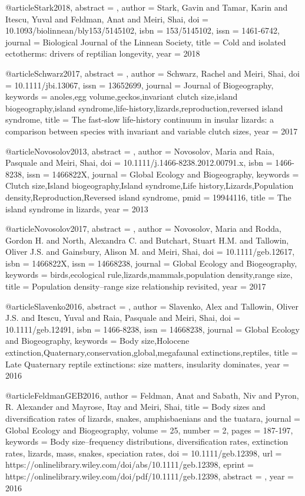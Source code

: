 {{{{{{@article{Stark2018,
abstract = {},
author = {Stark, Gavin and Tamar, Karin and Itescu, Yuval and Feldman, Anat and Meiri, Shai},
doi = {10.1093/biolinnean/bly153/5145102},
isbn = {153/5145102},
issn = {1461-6742},
journal = {Biological Journal of the Linnean Society},
title = {{Cold and isolated ectotherms: drivers of reptilian longevity}},
year = {2018}
}

@article{Schwarz2017,
abstract = {},
author = {Schwarz, Rachel and Meiri, Shai},
doi = {10.1111/jbi.13067},
issn = {13652699},
journal = {Journal of Biogeography},
keywords = {anoles,egg volume,geckos,invariant clutch size,island biogeography,island syndrome,life-history,lizards,reproduction,reversed island syndrome},
title = {{The fast-slow life-history continuum in insular lizards: a comparison between species with invariant and variable clutch sizes}},
year = {2017}
}

@article{Novosolov2013,
abstract = {},
author = {Novosolov, Maria and Raia, Pasquale and Meiri, Shai},
doi = {10.1111/j.1466-8238.2012.00791.x},
isbn = {1466-8238},
issn = {1466822X},
journal = {Global Ecology and Biogeography},
keywords = {Clutch size,Island biogeography,Island syndrome,Life history,Lizards,Population density,Reproduction,Reversed island syndrome},
pmid = {19944116},
title = {{The island syndrome in lizards}},
year = {2013}
}

@article{Novosolov2017,
abstract = {},
author = {Novosolov, Maria and Rodda, Gordon H. and North, Alexandra C. and Butchart, Stuart H.M. and Tallowin, Oliver J.S. and Gainsbury, Alison M. and Meiri, Shai},
doi = {10.1111/geb.12617},
isbn = {1466822X},
issn = {14668238},
journal = {Global Ecology and Biogeography},
keywords = {birds,ecological rule,lizards,mammals,population density,range size},
title = {{Population density–range size relationship revisited}},
year = {2017}
}

@article{Slavenko2016,
abstract = {},
author = {Slavenko, Alex and Tallowin, Oliver J.S. and Itescu, Yuval and Raia, Pasquale and Meiri, Shai},
doi = {10.1111/geb.12491},
isbn = {1466-8238},
issn = {14668238},
journal = {Global Ecology and Biogeography},
keywords = {Body size,Holocene extinction,Quaternary,conservation,global,megafaunal extinctions,reptiles},
title = {{Late Quaternary reptile extinctions: size matters, insularity dominates}},
year = {2016}
}

@article{FeldmanGEB2016,
author = {Feldman, Anat and Sabath, Niv and Pyron, R. Alexander and Mayrose, Itay and Meiri, Shai},
title = {Body sizes and diversification rates of lizards, snakes, amphisbaenians and the tuatara},
journal = {Global Ecology and Biogeography},
volume = {25},
number = {2},
pages = {187-197},
keywords = {Body size–frequency distributions, diversification rates, extinction rates, lizards, mass, snakes, speciation rates},
doi = {10.1111/geb.12398},
url = {https://onlinelibrary.wiley.com/doi/abs/10.1111/geb.12398},
eprint = {https://onlinelibrary.wiley.com/doi/pdf/10.1111/geb.12398},
abstract = {},
year = {2016}
}


}}}}}}
